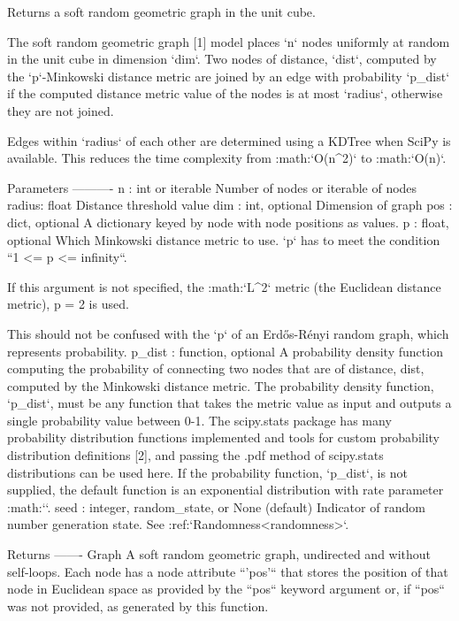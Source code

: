 \begin{DoxyVerb}Returns a soft random geometric graph in the unit cube.

The soft random geometric graph [1] model places `n` nodes uniformly at
random in the unit cube in dimension `dim`. Two nodes of distance, `dist`,
computed by the `p`-Minkowski distance metric are joined by an edge with
probability `p_dist` if the computed distance metric value of the nodes
is at most `radius`, otherwise they are not joined.

Edges within `radius` of each other are determined using a KDTree when
SciPy is available. This reduces the time complexity from :math:`O(n^2)`
to :math:`O(n)`.

Parameters
----------
n : int or iterable
    Number of nodes or iterable of nodes
radius: float
    Distance threshold value
dim : int, optional
    Dimension of graph
pos : dict, optional
    A dictionary keyed by node with node positions as values.
p : float, optional
    Which Minkowski distance metric to use.
    `p` has to meet the condition ``1 <= p <= infinity``.

    If this argument is not specified, the :math:`L^2` metric
    (the Euclidean distance metric), p = 2 is used.

    This should not be confused with the `p` of an Erdős-Rényi random
    graph, which represents probability.
p_dist : function, optional
    A probability density function computing the probability of
    connecting two nodes that are of distance, dist, computed by the
    Minkowski distance metric. The probability density function, `p_dist`,
    must be any function that takes the metric value as input
    and outputs a single probability value between 0-1. The scipy.stats
    package has many probability distribution functions implemented and
    tools for custom probability distribution definitions [2], and passing
    the .pdf method of scipy.stats distributions can be used here.  If the
    probability function, `p_dist`, is not supplied, the default function
    is an exponential distribution with rate parameter :math:``.
seed : integer, random_state, or None (default)
    Indicator of random number generation state.
    See :ref:`Randomness<randomness>`.

Returns
-------
Graph
    A soft random geometric graph, undirected and without self-loops.
    Each node has a node attribute ``'pos'`` that stores the
    position of that node in Euclidean space as provided by the
    ``pos`` keyword argument or, if ``pos`` was not provided, as
    generated by this function.


\end{DoxyVerb}
